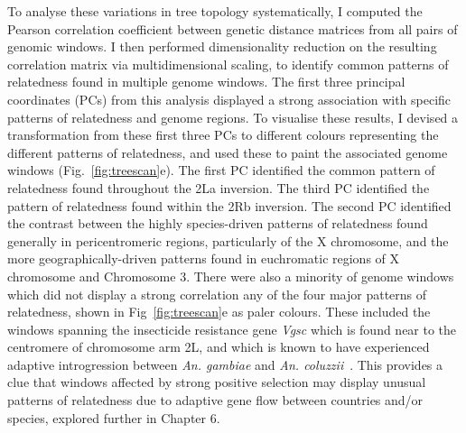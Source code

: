 \documentclass[a4paper,11pt,abstracton,hidelinks]{scrartcl}
\begin{document}
To analyse these variations in tree topology systematically, I computed the Pearson correlation coefficient between genetic distance matrices from all pairs of genomic windows.
%
I then performed dimensionality reduction on the resulting correlation matrix via multidimensional scaling, to identify common patterns of relatedness found in multiple genome windows.
%
The first three principal coordinates (PCs) from this analysis displayed a strong association with specific patterns of relatedness and genome regions.
%
To visualise these results, I devised a transformation from these first three PCs to different colours representing the different patterns of relatedness, and used these to paint the associated genome windows (Fig.~\ref{fig:treescan}e).
%
The first PC identified the common pattern of relatedness found throughout the 2La inversion.
%
The third PC identified the pattern of relatedness found within the 2Rb inversion.
%
The second PC identified the contrast between the highly species-driven patterns of relatedness found generally in pericentromeric regions, particularly of the X chromosome, and the more geographically-driven patterns found in euchromatic regions of X chromosome and Chromosome 3.
%
There were also a minority of genome windows which did not display a strong correlation any of the four major patterns of relatedness, shown in Fig~\ref{fig:treescan}e as paler colours.
%
These included the windows spanning the insecticide resistance gene \textit{Vgsc} which is found near to the centromere of chromosome arm 2L, and which is known to have experienced adaptive introgression between \textit{An. gambiae} and \textit{An. coluzzii}~\parencite{Clarkson2014,Norris2015}.
%
This provides a clue that windows affected by strong positive selection may display unusual patterns of relatedness due to adaptive gene flow between countries and/or species, explored further in Chapter 6.
\end{document}
